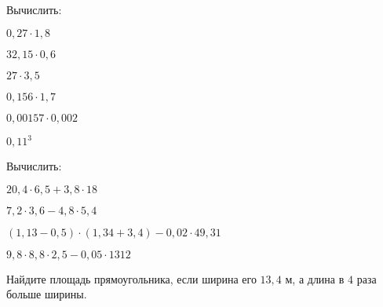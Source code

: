 \begin{class}[type=class, number=4]
\begin{listofex}
\begin{enumcols}[itemcolumns=1]
		\end{enumcols}
		\item Вычислить:
		\begin{enumcols}[itemcolumns=3]
			\item \( 0,27\cdot1,8 \)
			\item \( 32,15\cdot0,6 \)
			\item \( 27\cdot3,5 \)
			\item \( 0,156\cdot1,7 \)
			\item \( 0,00157\cdot0,002 \)
			\item \( 0,11^3 \)
		\end{enumcols}
		\item Вычислить:
		\begin{enumcols}[itemcolumns=2]
			\item \( 20,4\cdot6,5+3,8\cdot18 \)
			\item \( 7,2\cdot3,6-4,8\cdot5,4 \)
			\item \( (1,13-0,5)\cdot(1,34+3,4)-0,02\cdot49,31 \)
			\item \( 9,8\cdot8,8\cdot2,5-0,05\cdot1312 \)
		\end{enumcols}
		\item Найдите площадь прямоугольника, если ширина его \( 13,4 \) м, а длина в \( 4 \) раза больше ширины.
	\end{listofex}
\end{class}
